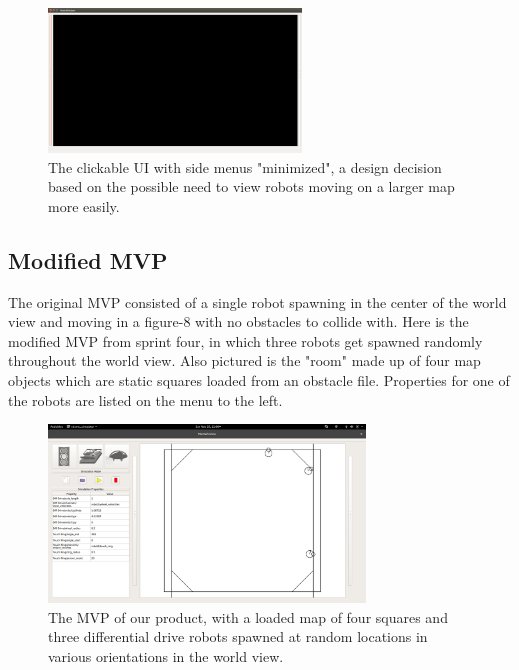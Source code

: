 \begin{figure}[H]
\begin{center}
\includegraphics[width=0.60\textwidth]{./Images/Sprint1_clickableUI_NoMenus}
\end{center}
\caption{The clickable UI with side menus "minimized", a design decision based on the possible need to view robots moving on a larger map more easily. \label{clickableuinomenus}}
\end{figure}

\subsection{Modified MVP}

The original MVP consisted of a single robot spawning in the center of the world view and moving in a figure-8 with no obstacles to collide with. Here is the modified MVP from sprint four, in which three robots get spawned randomly throughout the world view. Also pictured is the "room" made up of four map objects which are static squares loaded from an obstacle file. Properties for one of the robots are listed on the menu to the left.

\begin{figure}[!htb]
\begin{center}
\includegraphics[width=0.75\textwidth]{./Images/Sprint3_hasBox_originalUI}
\end{center}
\caption{The MVP of our product, with a loaded map of four squares and three differential drive robots spawned at random locations in various orientations in the world view. \label{mvp}}
\end{figure}